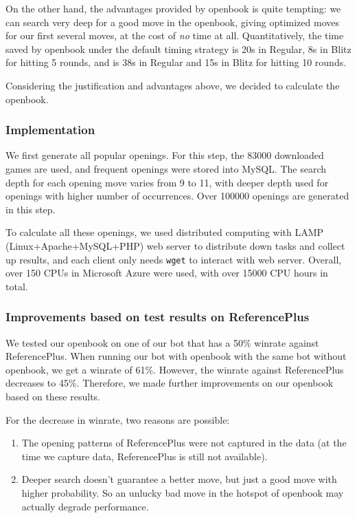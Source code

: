 \documentclass[10pt,twosidep]{article}
\begin{document}
On the other hand, the advantages provided by openbook is quite tempting: we can search very deep for a good move in the openbook, giving optimized moves for our first several moves, at the cost of {\it no} time at all. Quantitatively, the time saved by openbook under the default timing strategy is 20s in Regular, 8s in Blitz for hitting 5 rounds, and is 38s in Regular and 15s in Blitz for hitting 10 rounds. 

Considering the justification and advantages above, we decided to calculate the openbook. 

\subsubsection{Implementation}
We first generate all popular openings. For this step, the 83000 downloaded games are used, and frequent openings were stored into MySQL. The search depth for each opening move varies from 9 to 11, with deeper depth used for openings with higher number of occurrences. Over 100000 openings are generated in this step. 

To calculate all these openings, we used distributed computing with LAMP (Linux+Apache+MySQL+PHP) web server to distribute down tasks and collect up results, and each client only needs {\tt wget} to interact with web server. Overall, over 150 CPUs in Microsoft Azure were used, with over 15000 CPU hours in total. 

\subsubsection{Improvements based on test results on ReferencePlus}
We tested our openbook on one of our bot that has a 50\% winrate against ReferencePlus. When running our bot with openbook with the same bot without openbook, we get a winrate of 61\%. However, the winrate against ReferencePlus decreases to 45\%. Therefore, we made further improvements on our openbook based on these results. 

For the decrease in winrate, two reasons are possible: 
\begin{enumerate}
    \item The opening patterns of ReferencePlus were not captured in the data (at the time we capture data, ReferencePlus is still not available).
    \item Deeper search doesn't guarantee a better move, but just a good move with higher probability. So an unlucky bad move in the hotspot of openbook may actually degrade performance.
\end{enumerate}
\end{document}
